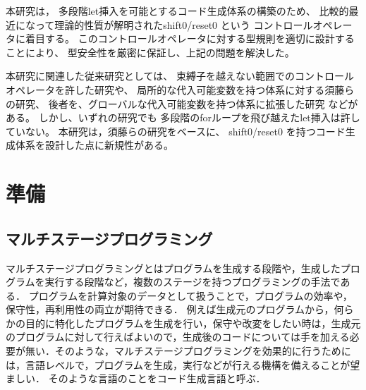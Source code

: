 \documentclass[T]{compsoft}
\theoremstyle{break}
\begin{document}


本研究は，
多段階let挿入を可能とするコード生成体系の構築のため、
比較的最近になって理論的性質が解明されたshift0/reset0 という
コントロールオペレータに着目する。
このコントロールオペレータに対する型規則を適切に設計することにより、
型安全性を厳密に保証し、上記の問題を解決した。

本研究に関連した従来研究としては、
束縛子を越えない範囲でのコントロールオペレータを許した研究や、
局所的な代入可能変数を持つ体系に対する須藤らの研究\cite{Sudo2014}、
後者を、グローバルな代入可能変数を持つ体系に拡張した研究
\cite{Aplas2016}などがある。
しかし、いずれの研究でも 多段階のforループを飛び越えたlet挿入は許していない。
本研究は，須藤らの研究をベースに、
shift0/reset0 を持つコード生成体系を設計した点に新規性がある。

\section{準備}
\subsection{マルチステージプログラミング}
マルチステージプログラミングとはプログラムを生成する段階や，生成したプログラムを実行する段階など，複数のステージを持つプログラミングの手法である．
プログラムを計算対象のデータとして扱うことで，プログラムの効率や，保守性，再利用性の両立が期待できる．
例えば生成元のプログラムから，何らかの目的に特化したプログラムを生成を行い，保守や改変をしたい時は，生成元のプログラムに対して行えばよいので，生成後のコードについては手を加える必要が無い．そのような，マルチステージプログラミングを効果的に行うためには，言語レベルで，プログラムを生成，実行などが行える機構を備えることが望ましい．
そのような言語のことをコード生成言語と呼ぶ．
\end{document}
